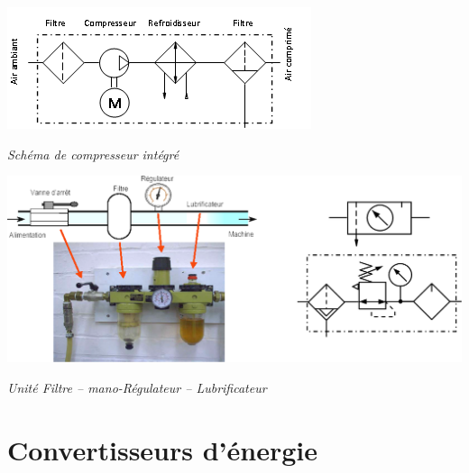 \documentclass[10pt]{article}
\begin{document}
\begin{minipage}[c]{.47\textwidth}
\begin{center}
\includegraphics[width=.95\textwidth]{images/Fig_01_Compresseur}

\textit{Schéma de compresseur intégré}
\end{center}
\end{minipage} \hfill
\begin{minipage}[c]{.5\textwidth}
\begin{center}
\includegraphics[width=\textwidth]{images/Fig_02_FRL}

\textit{Unité Filtre -- mano-Régulateur -- Lubrificateur}
\end{center}
\end{minipage} 


\section{Convertisseurs d'énergie}
\end{document}
